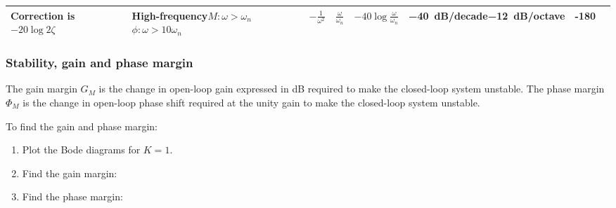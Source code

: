 \documentclass[10pt, twocolumn]{article}
\begin{document}
\begin{table*}[ht]
\begin{tabular}{
      p{5.5em} | p{6.8em} c | c c p{7.5em} | c c
    }
    Correction is \(-20\log{2\zeta}\)                          & High-frequency\newline{}\(M: \omega > \omega_n\)\newline{}\(\phi: \omega > 10\omega_n\)         & \(-\frac{1}{\omega^2}\)    & \(\frac{\omega}{\omega_n}\) & \(-40\log{\frac{\omega}{\omega_n}}\) & \SI{-40}{\deci\bel}/decade\newline{}\SI{-12}{\deci\bel}/octave & -180                    &                                           \\ \bottomrule
  \end{tabular}
\end{table*}


\subsubsection{Stability, gain and phase margin}
The gain margin \(G_M\) is the change in open-loop gain expressed in \si{\deci\bel} required to make the closed-loop system unstable.
The phase margin \(\Phi_M\) is the change in open-loop phase shift required at the unity gain to make the closed-loop system unstable.

To find the gain and phase margin:
\begin{enumerate}
  \item Plot the Bode diagrams for \(K = 1\).
  \item Find the gain margin:
  \item Find the phase margin:
\end{enumerate}
\end{document}
